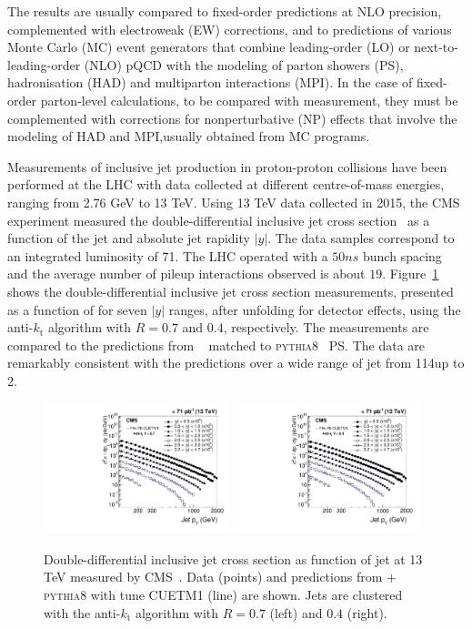 \documentclass{PoS}
\providecommand{\kts}{\ensuremath{k_{\mathrm{t}}}\xspace}
\providecommand{\PYTHIAE} {{\textsc{pythia8}}\xspace}
\begin{document}
The results are usually compared to fixed-order predictions at NLO precision, complemented with electroweak (EW) corrections, and to predictions of
various Monte Carlo (MC) event generators that combine leading-order (LO) or next-to-leading-order (NLO) pQCD with the modeling of parton
showers (PS), hadronisation (HAD) and multiparton interactions (MPI).
In the case of fixed-order parton-level calculations, to be compared with measurement, they must be complemented with corrections for nonperturbative
(NP) effects that involve the modeling of HAD and MPI,usually obtained from MC programs. 

Measurements of inclusive jet production in proton-proton collisions have been performed at the LHC with data collected
at different centre-of-mass energies, ranging from 2.76 GeV to 13 TeV.  
Using 13 TeV data collected in 2015, the CMS experiment measured the double-differential inclusive jet
cross section~\cite{Khachatryan:2016wdh} as a function of the jet \pt and absolute jet rapidity $|y|$. The data samples correspond to
an integrated luminosity of 71\pbinv. The LHC operated with a $50\unit{ns}$ bunch spacing and the
average number of pileup interactions observed is about $19$.   
Figure~\ref{fig:crossSection} shows the double-differential inclusive jet cross section measurements,
presented as a function of \pt for seven $|y|$ ranges, after
unfolding for detector effects, using the anti-\kts algorithm with $R =
0.7$ and $0.4$, respectively. The measurements are compared to the predictions from \POWHEG~\cite{Alioli:2010xa}
matched to \PYTHIAE~\cite{Sjostrand:2007gs} PS. The data are remarkably consistent with the predictions over a wide range of jet \pt from 114\GeV up to
2\TeV.
\begin{figure}[htbp] \centering
  \includegraphics[width=0.48\textwidth]{Figure1-a.pdf}
  \includegraphics[width=0.48\textwidth]{Figure1-b.pdf}
  \caption{Double-differential inclusive jet cross section as function of jet \pt at 13 TeV measured by CMS~\cite{Khachatryan:2016wdh}. Data (points) and
predictions from \POWHEG + \PYTHIAE with tune CUETM1 (line) are shown. Jets are clustered with the anti-\kts
algorithm with $R = 0.7$ (left) and $0.4$ (right).}
  \label{fig:crossSection}
\end{figure}
\end{document}
